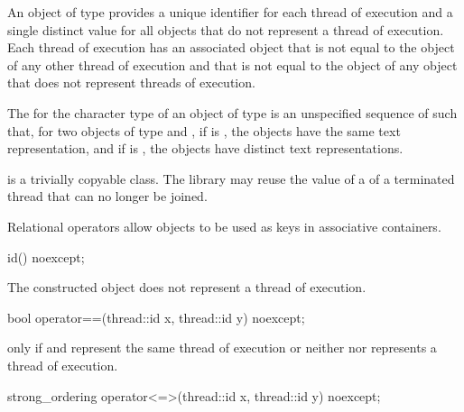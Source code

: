 \pnum
An object of type  provides a unique identifier for
each thread of execution and a single distinct value for all 
objects that do not represent a thread of
execution. Each thread of execution has an
associated  object that is not equal to the
 object of any other thread of execution and that is not
equal to the  object of any  object that
does not represent threads of execution.

\pnum
The  for
the character type  of an object of type 
is an unspecified sequence of  such that,
for two objects of type   and ,
if  is ,
the  objects have the same text representation, and
if  is ,
the  objects have distinct text representations.

\pnum
{} is a trivially copyable class.
The library may reuse the value of a  of a terminated thread that can no longer be joined.

\pnum
\begin{note}
Relational operators allow  objects to be used as
keys in associative containers.
\end{note}

%
\begin{itemdecl}
id() noexcept;
\end{itemdecl}

\begin{itemdescr}
\pnum
\ensures
The constructed object does not represent a thread of execution.
\end{itemdescr}

%
\begin{itemdecl}
bool operator==(thread::id x, thread::id y) noexcept;
\end{itemdecl}

\begin{itemdescr}
\pnum
\returns
{} only if  and  represent the same
thread of execution or neither  nor  represents a thread of
execution.
\end{itemdescr}

%
\begin{itemdecl}
strong_ordering operator<=>(thread::id x, thread::id y) noexcept;
\end{itemdecl}

